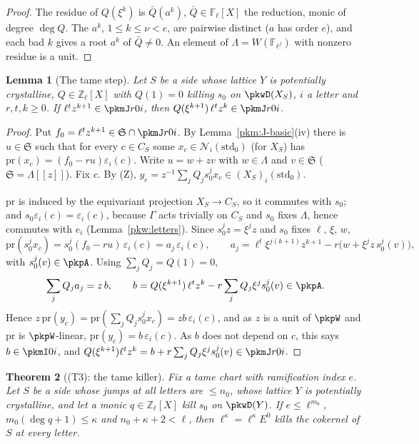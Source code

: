 \documentclass[10pt]{amsart}
\newtheorem{theorem}{Theorem}[section]
\newtheorem{lemma}[theorem]{Lemma}
\theoremstyle{definition}
\theoremstyle{remark}
\newcommand{\Z}{\mathbb Z}
\begin{document}
\begin{proof}
The residue of $Q(\xi^k)$ is $\bar Q(a^k)$, $\bar Q\in\mathbb F_\ell[X]$ the reduction, monic of degree $\deg Q$.
The $a^k$, $1\le k\le\nu<e$, are pairwise distinct ($a$ has order $e$), and each bad $k$ gives a root $a^k$ of
$\bar Q\ne0$. An element of $\Lambda=W(\mathbb F_{\ell^f})$ with nonzero residue is a unit.
\end{proof}

\begin{lemma}[The tame step]\label{pkw:step}
Let $S$ be a side whose lattice $Y$ is potentially crystalline, $Q\in\Z_\ell[X]$ with $Q(1)=0$
killing $s_0$ on $\pkwD(X_S)$, $i$ a letter and $r,t,k\ge0$. If $\ell^tz^{k+1}\in\pkmJ r0i$, then
$Q(\xi^{k+1})\,\ell^tz^k\in\pkmJ r0i$.
\end{lemma}

\begin{proof}
Put $f_0=\ell^tz^{k+1}\in\mathfrak S\cap\pkmJ r0i$. By Lemma~\ref{pkm:J-basic}(iv) there is $u\in\mathfrak S$
such that for every $c\in C_S$ some $x_c\in\mathcal N_i(\mathrm{std}_0)$ (for $X_S$) has
$\mathrm{pr}(x_c)=(f_0-ru)\varepsilon_i(c)$. Write $u=w+zv$ with $w\in\Lambda$ and $v\in\mathfrak S$
($\mathfrak S=\Lambda[[z]]$). Fix $c$. By (Z), $y_c=z^{-1}\sum_jQ_js_0^jx_c\in(X_S)_i(\mathrm{std}_0)$.

$\mathrm{pr}$ is induced by the equivariant projection $X_S\to C_S$, so it commutes with $s_0$; and
$s_0\varepsilon_i(c)=\varepsilon_i(c)$, because $\Gamma$ acts trivially on $C_S$ and $s_0$ fixes $\Lambda$, hence
commutes with $e_i$ (Lemma~\ref{pkw:letters}). Since $s_0^jz=\xi^jz$ and $s_0$ fixes $\ell$, $\xi$, $w$,
\[
\mathrm{pr}(s_0^jx_c)=s_0^j(f_0-ru)\,\varepsilon_i(c)=a_j\,\varepsilon_i(c),\qquad
a_j=\ell^t\xi^{j(k+1)}z^{k+1}-r\bigl(w+\xi^jz\,s_0^j(v)\bigr),
\]
with $s_0^j(v)\in\pkpA$. Using $\sum_jQ_j=Q(1)=0$,
\[
\sum_jQ_ja_j=z\,b,\qquad b=Q(\xi^{k+1})\,\ell^tz^k-r\sum_jQ_j\xi^js_0^j(v)\in\pkpA .
\]
Hence $z\,\mathrm{pr}(y_c)=\mathrm{pr}(\sum_jQ_js_0^jx_c)=zb\,\varepsilon_i(c)$, and as $z$ is a unit of $\pkpW$
and $\mathrm{pr}$ is $\pkpW$-linear, $\mathrm{pr}(y_c)=b\,\varepsilon_i(c)$. As $b$ does not depend on $c$, this
says $b\in\pkmI0i$, and $Q(\xi^{k+1})\ell^tz^k=b+r\sum_jQ_j\xi^js_0^j(v)\in\pkmJ r0i$.
\end{proof}

\begin{theorem}[(T3): the tame killer]\label{pkw:T3}
Fix a tame chart with ramification index $e$. Let $S$ be a side whose jumps at all letters are
$\le n_0$, whose lattice $Y$ is potentially crystalline, and let a monic $q\in\Z_\ell[X]$ kill $s_0$ on
$\pkwD(Y)$. If $e\le\ell^{m_0}$, $m_0(\deg q+1)\le\kappa$ and $n_0+\kappa+2<\ell$, then $\ell^\kappa=\ell^\kappa E^0$
kills the cokernel of $S$ at every letter.
\end{theorem}
\end{document}
